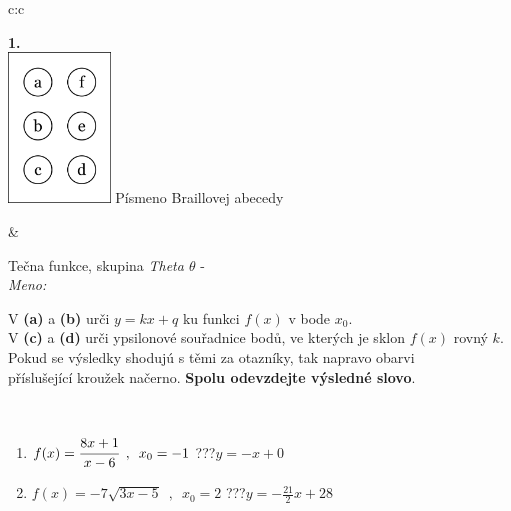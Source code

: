 \documentclass[10pt]{report}
\begin{document}
\begin{tabular}{c:c}
\begin{minipage}[c][104.5mm][t]{0.5\linewidth}
\begin{center}
\begin{minipage}{0.20\linewidth}
\begin{center}
{\Huge\bfseries 1.} \\[2mm]
\includegraphics[height=40mm]{../images/braille.png}
{\small Písmeno Braillovej abecedy}
\end{center}
\end{minipage}
\end{center}
\end{minipage}
&
\begin{minipage}[c][104.5mm][t]{0.5\linewidth}
\begin{center}
\vspace{7mm}
{\huge Tečna funkce, skupina \textit{Theta $\theta$} -}\\[5mm]
\textit{Meno:}\phantom{xxxxxxxxxxxxxxxxxxxxxxxxxxxxxxxxxxxxxxxxxxxxxxxxxxxxxxxxxxxxxxxxx}\\[5mm]
\begin{minipage}{0.95\linewidth}
\begin{center}
V \textbf{(a)} a \textbf{(b)} urči  $y = kx + q$ ku funkci $f(x)$ v bode $x_0$.\\V \textbf{(c)} a \textbf{(d)} urči ypsilonové souřadnice bodů, ve kterých je sklon $f(x)$ rovný $k$.\\Pokud se výsledky shodujú s těmi za otazníky, tak napravo obarvi\\příslušející kroužek načerno. \textbf{Spolu odevzdejte výsledné slovo}.
\end{center}
\end{minipage}
\\[1mm]
\begin{minipage}{0.79\linewidth}
\begin{center}
\begin{varwidth}{\linewidth}
\begin{enumerate}
\small
\item $f(x)=\cfrac{8x+1}{x-6}\enspace , \enspace x_0=-1$\quad \dotfill\; ???\;\dotfill \quad $y = -x+0$
\item $f(x)=-7\sqrt{3x-5}\enspace , \enspace x_0=2$\quad \dotfill\; ???\;\dotfill \quad $y = -\frac{21}{2}x+28$

\end{enumerate}
\end{varwidth}
\end{center}
\end{minipage}
\end{center}
\end{minipage}
\end{tabular}
\end{document}

